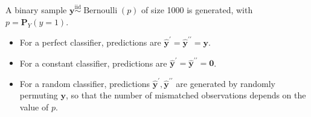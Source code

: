 \begin{frame}
	A binary sample $\bm{y} \overset{\text{iid}}{\sim} \operatorname{Bernoulli}(p)$ of size 1000 is generated, 
    with $p = \mathbf{P}_Y(y = 1)$. 

	\begin{itemize}
        \item For a perfect classifier, predictions are $\hat{\bm{y}}^\prime = \hat{\bm{y}}^{\prime \prime} = \bm{y}$.
        \item For a constant classifier, predictions are $\hat{\bm{y}}^\prime = \hat{\bm{y}}^{\prime \prime} = \bm{0}$.
        \item For a random classifier, predictions $\hat{\bm{y}}^\prime, \hat{\bm{y}}^{\prime \prime}$ are generated by randomly permuting $\bm{y}$, so 
        that the number of mismatched observations depends on the value of $p$. 

    \end{itemize}


\end{frame}
